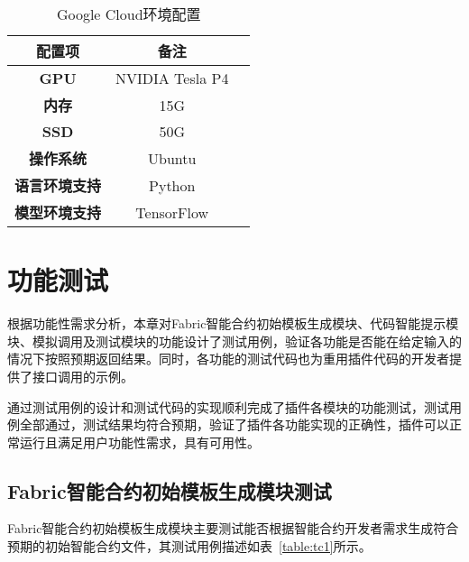 \begin{table}[htb]\scriptsize
\centering
\caption{Google Cloud环境配置}
\vspace{2mm}
\begin{tabular}{ccc}
\toprule
\textbf{配置项}&\textbf{备注}\\
\midrule
\textbf{GPU}&NVIDIA Tesla P4\\ \hline
\textbf{内存}&15G\\ \hline
\textbf{SSD}&50G\\ \hline
\textbf{操作系统}&Ubuntu\\ \hline
\textbf{语言环境支持}&Python\\ \hline
\textbf{模型环境支持}&TensorFlow\\
\bottomrule
\end{tabular}
\label{table:cloudEnvironment}
\end{table}

\section{功能测试}

根据功能性需求分析，本章对Fabric智能合约初始模板生成模块、代码智能提示模块、模拟调用及测试模块的功能设计了测试用例，验证各功能是否能在给定输入的情况下按照预期返回结果。同时，各功能的测试代码也为重用插件代码的开发者提供了接口调用的示例。

通过测试用例的设计和测试代码的实现顺利完成了插件各模块的功能测试，测试用例全部通过，测试结果均符合预期，验证了插件各功能实现的正确性，插件可以正常运行且满足用户功能性需求，具有可用性。

\subsection{Fabric智能合约初始模板生成模块测试}

Fabric智能合约初始模板生成模块主要测试能否根据智能合约开发者需求生成符合预期的初始智能合约文件，其测试用例描述如表~\ref{table:tc1}所示。

